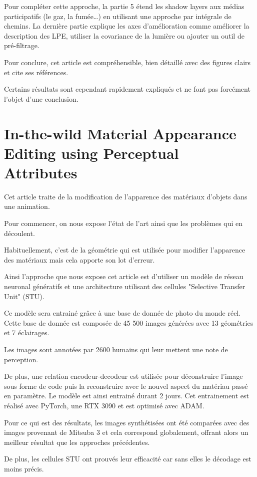 \documentclass{article}
\begin{document}
Pour compléter cette approche, la partie 5 étend les shadow layers aux médias participatifs (le gaz, la fumée…) en utilisant une approche par intégrale de chemins. La dernière partie explique les axes d’amélioration comme améliorer la description des LPE, utiliser la covariance de la lumière ou ajouter un outil de pré-filtrage.

Pour conclure, cet article est compréhensible, bien détaillé avec des figures clairs et cite ses références.

Certains résultats sont cependant rapidement expliqués et ne font pas forcément l’objet d’une conclusion.

\newpage
\section{In-the-wild Material Appearance Editing using Perceptual Attributes}
Cet article traite de la modification de l’apparence des matériaux d’objets dans une animation.

Pour commencer, on nous expose l’état de l’art ainsi que les problèmes qui en découlent.

Habituellement, c’est de la géométrie qui est utilisée pour modifier l’apparence des matériaux mais cela apporte son lot d’erreur.

Ainsi l’approche que nous expose cet article est d’utiliser un modèle de réseau neuronal génératifs et une architecture utilisant des cellules "Selective Transfer Unit" (STU).

Ce modèle sera entrainé grâce à une base de donnée de photo du monde réel. Cette base de donnée est composée de 45 500 images générées avec 13 géométries et 7 éclairages.

Les images sont annotées par 2600 humains qui leur mettent une note de perception.

De plus, une relation encodeur-decodeur est utilisée pour déconstruire l’image sous forme de code puis la reconstruire avec le nouvel aspect du matériau passé en paramètre. Le modèle est ainsi entrainé durant 2 jours. Cet entrainement est réalisé avec PyTorch, une RTX 3090 et est optimisé avec ADAM.

Pour ce qui est des résultats, les images synthétisées ont été comparées avec des images provenant de Mitsuba 3 et cela correspond globalement, offrant alors un meilleur résultat que les approches précédentes.

De plus, les cellules STU ont prouvés leur efficacité car sans elles le décodage est moins précis.
\end{document}
